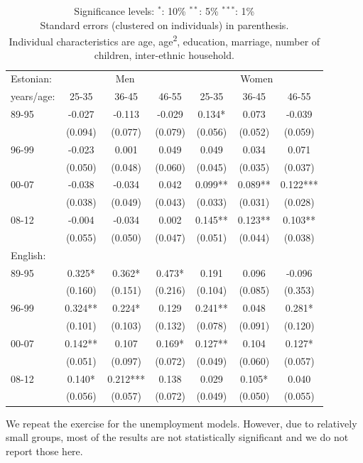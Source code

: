 \documentclass[12pt, a4paper]{article}
\def\tenpc{$^{\ast}$}
\def\fivepc{$^{\ast\ast}$}
\def\onepc{$^{\ast\ast\ast}$}
\newcommand{\legend}{\normalsize{Significance levels:\hspace{1em} \tenpc : 10\% \hspace{1em} \fivepc : 5\% \hspace{1em} \onepc : 1\% \normalsize}}
\newcommand{\modelTwo}{age, age\textsuperscript{2}, education, marriage, number of children, inter-ethnic household}
\begin{document}
\begin{table}[htbp]
\begin{tabular}{lccc|cc c}
		\midrule
		Estonian:&\multicolumn{3}{c|}{Men} &\multicolumn{3}{c}{Women}\\
		years/age: & 25-35  & 36-45  & 46-55  & 25-35  & 36-45  & 46-55  \\
		\midrule
		89-95   & -0.027 & -0.113  & -0.029 & 0.134* & 0.073  & -0.039  \\
		      & (0.094) & (0.077) & (0.079) & (0.056) & (0.052) & (0.059) \\
		96-99   & -0.023 & 0.001  & 0.049  & 0.049  & 0.034  & 0.071  \\
		      & (0.050) & (0.048) & (0.060) & (0.045) & (0.035) & (0.037) \\
		00-07   & -0.038 & -0.034  & 0.042  & 0.099** & 0.089** & 0.122*** \\
		      & (0.038) & (0.049) & (0.043) & (0.033) & (0.031) & (0.028) \\
		08-12   & -0.004 & -0.034  & 0.002  & 0.145** & 0.123** & 0.103** \\
		      & (0.055) & (0.050) & (0.047) & (0.051) & (0.044) & (0.038) \\ \midrule
		English:  &     &     &     &     &     & 
           \\
     
		89-95   & 0.325* & 0.362*  & 0.473* & 0.191  & 0.096  & -0.096  \\
		      & (0.160) & (0.151) & (0.216) & (0.104) & (0.085) & (0.353) \\
		96-99   & 0.324** & 0.224*  & 0.129  & 0.241** & 0.048  & 0.281*  \\
		      & (0.101) & (0.103) & (0.132) & (0.078) & (0.091) & (0.120) \\
		00-07   & 0.142** & 0.107  & 0.169* & 0.127** & 0.104  & 0.127*  \\
		      & (0.051) & (0.097) & (0.072) & (0.049) & (0.060) & (0.057) \\
		08-12   & 0.140* & 0.212*** & 0.138  & 0.029  & 0.105* & 0.040  \\
		      & (0.056) & (0.057) & (0.072) & (0.049) & (0.050) & (0.055) \\
		\bottomrule
	\end{tabular}

	\caption*{\legend \\ Standard errors (clustered on individuals) in parenthesis. \\ Individual characteristics are \modelTwo. 	}
	\label{tab:age_group_trend}
\end{table}

We repeat the exercise for the unemployment models.
However, due to relatively small groups, most of the results are not
statistically significant and we
do not report those here.
\end{document}
